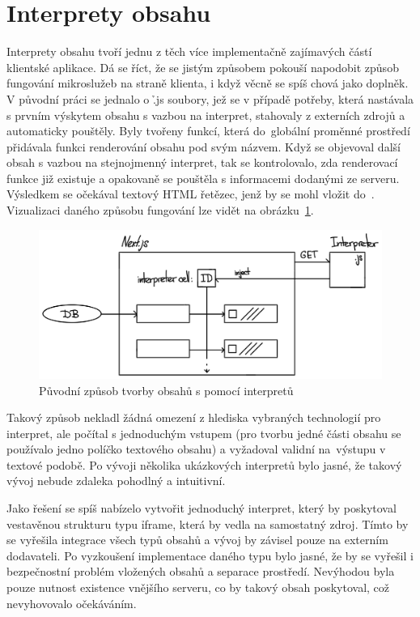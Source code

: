 \section{Interprety obsahu}\label{sec:client-interpret}

Interprety obsahu tvoří jednu z těch více implementačně zajímavých částí klientské aplikace.
Dá se říct, že se jistým způsobem pokouší napodobit způsob fungování mikroslužeb na straně klienta, i když věcně se spíš chová jako doplněk.
V původní práci se jednalo o \h{.js} soubory, jež se v případě potřeby, která nastávala s prvním výskytem obsahu s vazbou na interpret, stahovaly z externích zdrojů a automaticky pouštěly.
Byly tvořeny  funkcí, která do~globální proměnné prostředí přidávala funkci renderování obsahu pod svým názvem.
Když se objevoval další obsah s vazbou na stejnojmenný interpret, tak se kontrolovalo, zda renderovací funkce již existuje a opakovaně se pouštěla s informacemi dodanými ze serveru.
Výsledkem se očekával textový HTML řetězec, jenž by se mohl vložit do~.
Vizualizaci daného způsobu fungování lze vidět na obrázku~\ref{fig:client-interpreter-old}.

\begin{figure}[htbp]
   \centering
   \includegraphics[max width=\textwidth]{assets/interpreters}
   \caption{Původní způsob tvorby obsahů s pomocí interpretů}\label{fig:client-interpreter-old}
\end{figure}


Takový způsob nekladl žádná omezení z hlediska vybraných technologií pro interpret, ale počítal s jednoduchým vstupem (pro tvorbu jedné části obsahu se používalo jedno políčko textového obsahu) a vyžadoval validní  na~výstupu v textové podobě.
Po vývoji několika ukázkových interpretů bylo jasné, že takový vývoj nebude zdaleka pohodlný a intuitivní.

Jako řešení se spíš nabízelo vytvořit jednoduchý interpret, který by poskytoval vestavěnou strukturu typu \h{iframe}, která by vedla na samostatný zdroj.
Tímto by se vyřešila integrace všech typů obsahů a vývoj by závisel pouze na externím dodavateli.
Po vyzkoušení implementace daného typu bylo jasné, že by se vyřešil i bezpečnostní problém vložených obsahů a separace prostředí.
Nevýhodou byla pouze nutnost existence vnějšího serveru, co by takový obsah poskytoval, což nevyhovovalo očekáváním.

